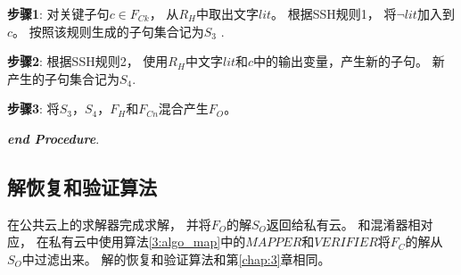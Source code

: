 \textbf{步骤1}:
对关键子句$c\in F_{Ck}$，
从$R_H$中取出文字$lit$。
根据SSH规则1，
将$\neg lit$加入到$c$。
按照该规则生成的子句集合记为$S_3$ .

\textbf{步骤2}:
根据SSH规则2，
使用$R_H$中文字$lit$和$c$中的输出变量，产生新的子句。
新产生的子句集合记为$S_4$.

\textbf{步骤3}:
将$S_3$，$S_4$，$F_H$和$F_{Cn}$混合产生$F_O$。

\textit{\textbf{end Procedure}}.
\subsection{解恢复和验证算法}\label{4:mappping}
%
%

在公共云上的求解器完成求解，
并将$F_O$的解$S_O$返回给私有云。
和混淆器相对应，
在私有云中使用算法\ref{3:algo_map}中的$MAPPER$和$VERIFIER$将$F_C$的解从$S_O$中过滤出来。
解的恢复和验证算法和第\ref{chap:3}章相同。
%
%

